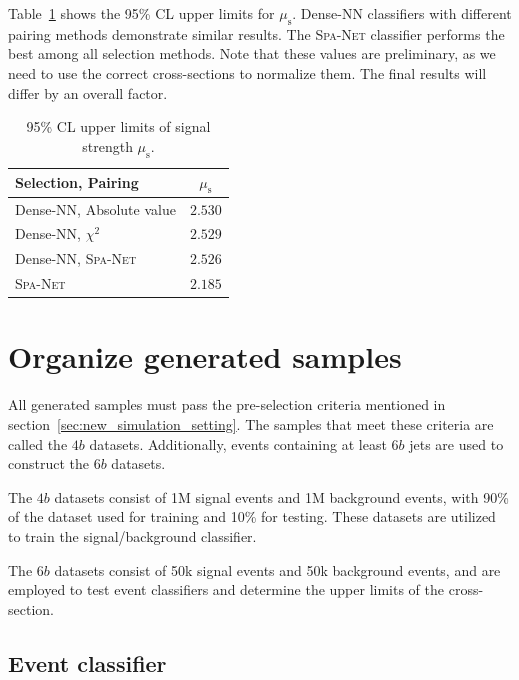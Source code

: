 \documentclass[12pt]{article}
\begin{document}
        Table~\ref{tab:signal_strength_upper_limit_tem} shows the 95\% CL upper limits for $\mu_{\text{s}}$. Dense-NN classifiers with different pairing methods demonstrate similar results. The \textsc{Spa-Net} classifier performs the best among all selection methods. Note that these values are preliminary, as we need to use the correct cross-sections to normalize them. The final results will differ by an overall factor.
        \begin{table}[htpb]
            \centering
            \caption{95\% CL upper limits of signal strength $\mu_{\text{s}}$.}
            \label{tab:signal_strength_upper_limit_tem}
            \begin{tabular}{l|c}
                Selection, Pairing         & $\mu_{\text{s}}$ \\ \hline
                Dense-NN, Absolute value   & $2.530$          \\
                Dense-NN, $\chi^2$         & $2.529$          \\
                Dense-NN, \textsc{Spa-Net} & $2.526$          \\
                \textsc{Spa-Net}           & $2.185$         
            \end{tabular}
        \end{table}
\section{Organize generated samples}%
\label{sec:organize_generated_samples}

    All generated samples must pass the pre-selection criteria mentioned in section~\ref{sec:new_simulation_setting}. The samples that meet these criteria are called the $4b$ datasets. Additionally, events containing at least $6b$ jets are used to construct the $6b$ datasets.

    The $4b$ datasets consist of 1M signal events and 1M background events, with 90\% of the dataset used for training and 10\% for testing. These datasets are utilized to train the signal/background classifier. 

    The $6b$ datasets consist of 50k signal events and 50k background events, and are employed to test event classifiers and determine the upper limits of the cross-section.
    \subsection{Event classifier}%
    \label{sub:event_classifier}
        
\end{document}
